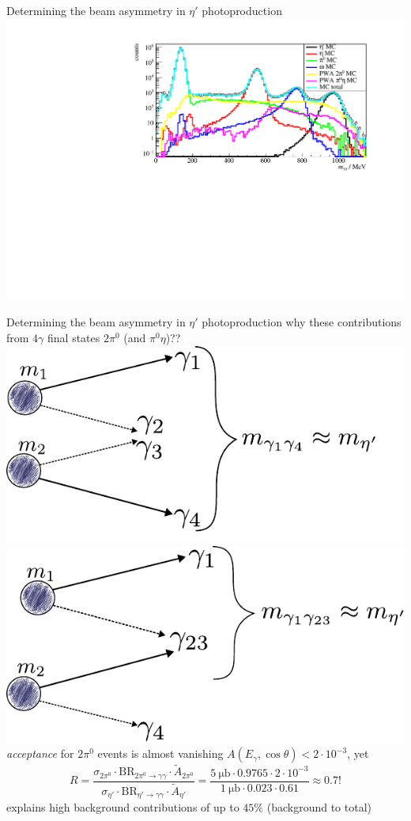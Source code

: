 \documentclass[11pt,aspectratio=169,dvipsnames]{beamer}
\begin{document}
\begin{frame}{Determining the beam asymmetry in $\eta'$ photoproduction}
	\includegraphics[width=\linewidth]{../../figs/hydrogen/invm_global.pdf}
\end{frame}
\begin{frame}{Determining the beam asymmetry in $\eta'$ photoproduction}
	why these contributions from $4\gamma$ final states $2\pi^0$ (and $\pi^0\eta$)??
	\pause
	\includegraphics[width=.49\linewidth]{../../figs/inkscape/mcgammas1.pdf}
	\includegraphics[width=.49\linewidth]{../../figs/inkscape/mcgammas2.pdf}
	\pause
	\emph{acceptance} for $2\pi^0$ events is almost vanishing $A(E_\gamma,\cos\theta)<2\cdot10^{-3}$, yet $$R=\frac{\sigma_{2\pi^0}\cdot\text{BR}_{2\pi^0\to\gamma\gamma}\cdot\tilde{A}_{2\pi^0}}{\sigma_{\eta'}\cdot\text{BR}_{\eta'\to\gamma\gamma}\cdot\tilde{A}_{\eta'}}=\frac{\SI{5}{\micro\barn}\cdot0.9765\cdot2\cdot10^{-3}}{\SI{1}{\micro\barn}\cdot0.023\cdot0.61}\approx0.7!$$
	explains high background contributions of up to $45\%$ (background to total)
	\begin{flushright}
		\cites{pdg,etap_cs,2pi0_cs}
	\end{flushright}
\end{frame}
\end{document}

